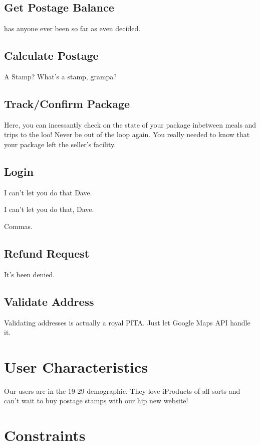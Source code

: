 \documentclass{scrreprt}
\begin{document}
\subsection{Get Postage Balance}

has anyone ever been so far as even decided.

\subsection{Calculate Postage}

A Stamp? What's a stamp, grampa?

\subsection{Track/Confirm Package}

Here, you can incessantly check on the state of your package inbetween meals 
and trips to the loo! Never be out of the loop again. You really needed to 
know that your package left the seller's facility.

\subsection{Login}

I can't let you do that Dave.

I can't let you do that, Dave.

Commas.

\subsection{Refund Request}

It's been denied.

\subsection{Validate Address}

Validating addresses is actually a royal PITA. Just let Google Maps API 
handle it.

\section{User Characteristics}

Our users are in the 19-29 demographic. They love iProducts of all sorts and 
can't wait to buy postage stamps with our hip new website!

\section{Constraints}
\end{document}
